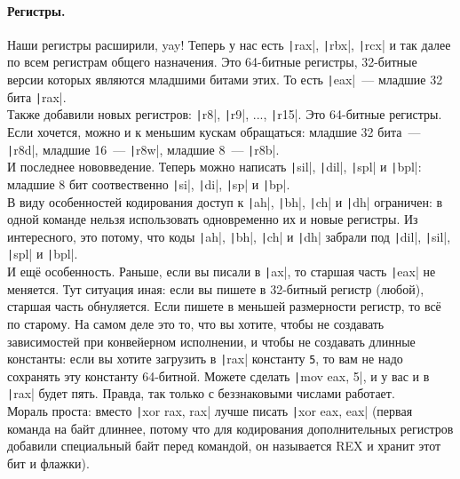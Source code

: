 \documentclass{article}
\begin{document}
    \paragraph{Регистры.}
    Наши регистры расширили, yay! Теперь у нас есть \texttt|rax|, \texttt|rbx|, \texttt|rcx| и так далее по всем регистрам общего назначения. Это 64-битные регистры, 32-битные версии которых являются младшими битами этих. То есть \texttt|eax|~--- младшие 32 бита \texttt|rax|.\\
    Также добавили новых регистров: \texttt|r8|, \texttt|r9|, ..., \texttt|r15|. Это 64-битные регистры. Если хочется, можно и к меньшим кускам обращаться: младшие 32 бита~--- \texttt|r8d|, младшие 16~--- \texttt|r8w|, младшие 8~--- \texttt|r8b|.\\
    И последнее нововведение. Теперь можно написать \texttt|sil|, \texttt|dil|, \texttt|spl| и \texttt|bpl|: младшие 8 бит соотвественно \texttt|si|, \texttt|di|, \texttt|sp| и \texttt|bp|.\\
    В виду особенностей кодирования доступ к \texttt|ah|, \texttt|bh|, \texttt|ch| и \texttt|dh| ограничен: в одной команде нельзя использовать одновременно их и новые регистры. Из интересного, это потому, что коды \texttt|ah|, \texttt|bh|, \texttt|ch| и \texttt|dh| забрали под \texttt|dil|, \texttt|sil|, \texttt|spl| и \texttt|bpl|.\\
    И ещё особенность. Раньше, если вы писали в \texttt|ax|, то старшая часть \texttt|eax| не меняется. Тут ситуация иная: если вы пишете в 32-битный регистр (любой), старшая часть обнуляется. Если пишете в меньшей размерности регистр, то всё по старому. На самом деле это то, что вы хотите, чтобы не создавать зависимостей при конвейерном исполнении, и чтобы не создавать длинные константы: если вы хотите загрузить в \texttt|rax| константу \Verb|5|, то вам не надо сохранять эту константу 64-битной. Можете сделать \texttt|mov eax, 5|, и у вас и в \texttt|rax| будет пять. Правда, так только с беззнаковыми числами работает.\\
    Мораль проста: вместо \texttt|xor rax, rax| лучше писать \texttt|xor eax, eax| (первая команда на байт длиннее, потому что для кодирования дополнительных регистров добавили специальный байт перед командой, он называется REX и хранит этот бит и флажки).\\
\end{document}
